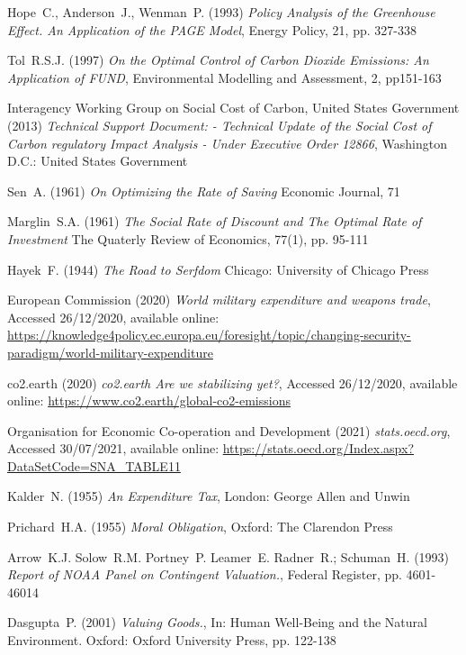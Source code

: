 \documentclass[11pt, oneside]{article}   	%
\begin{document}
\begin{thebibliography}{99}
 Hope~C., Anderson~J., Wenman~P. (1993)
\emph{Policy Analysis of the Greenhouse Effect. An Application of the PAGE Model},
Energy Policy, 21, pp. 327-338
	
 Tol~R.S.J. (1997)
\emph{On the Optimal Control of Carbon Dioxide Emissions: An Application of FUND},
Environmental Modelling and Assessment, 2, pp151-163
	
 Interagency Working Group on Social Cost of Carbon, United States Government (2013)
\emph{Technical Support Document: - Technical Update of the Social Cost of Carbon regulatory Impact Analysis - Under Executive Order 12866},
Washington D.C.: United States Government
	
 Sen~A. (1961)
\emph{On Optimizing the Rate of Saving}
Economic Journal, 71
	
 Marglin~S.A. (1961)
\emph{The Social Rate of Discount and The Optimal Rate of Investment}
The Quaterly Review of Economics, 77(1), pp. 95-111
	
 Hayek~F. (1944)
\emph{The Road to Serfdom}
Chicago: University of Chicago Press
	
 European Commission (2020)
\emph{World military expenditure and weapons trade},
Accessed 26/12/2020, available online: 
\url{https://knowledge4policy.ec.europa.eu/foresight/topic/changing-security-paradigm/world-military-expenditure}
	
 co2.earth (2020)
\emph{co2.earth Are we stabilizing yet?},
Accessed 26/12/2020, available online: 
\url{https://www.co2.earth/global-co2-emissions}
	
 Organisation for Economic Co-operation and Development (2021)
\emph{stats.oecd.org},
Accessed 30/07/2021, available online: 
\url{https://stats.oecd.org/Index.aspx?DataSetCode=SNA_TABLE11}
	
 Kalder~N. (1955)
\emph{An Expenditure Tax},
London: George Allen and Unwin
	
 Prichard~H.A. (1955)
\emph{Moral Obligation},
Oxford: The Clarendon Press

 Arrow~K.J. Solow~R.M. Portney~P. Leamer~E. Radner~R.; Schuman~H. (1993)
\emph{Report of NOAA Panel on Contingent Valuation.},
Federal Register, pp. 4601-46014
	
 Dasgupta~P. (2001)
\emph{Valuing Goods.},
In: Human Well-Being and the Natural Environment. Oxford: Oxford University Press, pp. 122-138
	

\end{thebibliography}
\end{document}
